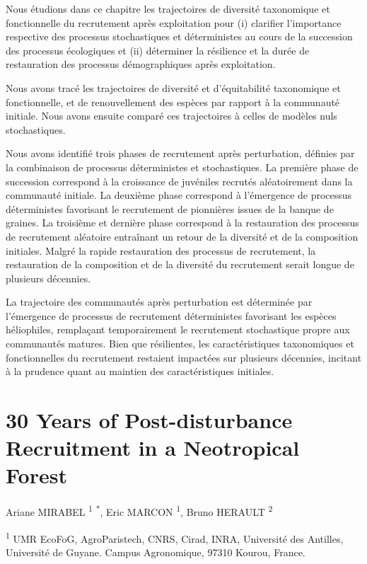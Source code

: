 \documentclass[
  11pt,
  french,
  A4paper,
  extrafontsizes,onecolumn,openright
  ]{memoir}
\begin{document}
Nous étudions dans ce chapitre les trajectoires de diversité taxonomique
et fonctionnelle du recrutement après exploitation pour (i) clarifier
l'importance respective des processus stochastiques et déterministes au
cours de la succession des processus écologiques et (ii) déterminer la
résilience et la durée de restauration des processus démographiques
après exploitation.

Nous avons tracé les trajectoires de diversité et d'équitabilité
taxonomique et fonctionnelle, et de renouvellement des espèces par
rapport à la communauté initiale. Nous avons ensuite comparé ces
trajectoires à celles de modèles nuls stochastiques.

Nous avons identifié trois phases de recrutement après perturbation,
définies par la combinaison de processus déterministes et stochastiques.
La première phase de succession correspond à la croissance de juvéniles
recrutés aléatoirement dans la communauté initiale. La deuxième phase
correspond à l'émergence de processus déterministes favorisant le
recrutement de pionnières issues de la banque de graines. La troisième
et dernière phase correspond à la restauration des processus de
recrutement aléatoire entraînant un retour de la diversité et de la
composition initiales. Malgré la rapide restauration des processus de
recrutement, la restauration de la composition et de la diversité du
recrutement serait longue de plusieurs décennies.

La trajectoire des communautés après perturbation est déterminée par
l'émergence de processus de recrutement déterministes favorisant les
espèces héliophiles, remplaçant temporairement le recrutement
stochastique propre aux communautés matures. Bien que résilientes, les
caractéristiques taxonomiques et fonctionnelles du recrutement restaient
impactées sur plusieurs décennies, incitant à la prudence quant au
maintien des caractéristiques initiales.

\newpage

\section{30 Years of Post-disturbance Recruitment in a Neotropical
Forest}\label{years-of-post-disturbance-recruitment-in-a-neotropical-forest}

Ariane MIRABEL \textsuperscript{1} \textsuperscript{*}, Eric MARCON
\textsuperscript{1}, Bruno HERAULT \textsuperscript{2} \newline

\textsuperscript{1} UMR EcoFoG, AgroParistech, CNRS, Cirad, INRA,
Université des Antilles, Université de Guyane. Campus Agronomique, 97310
Kourou, France.
\end{document}
